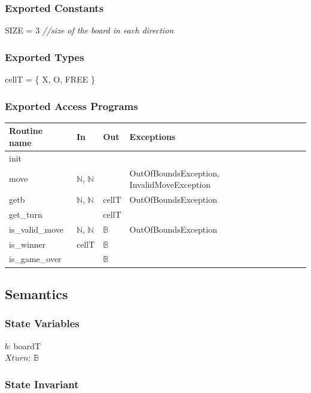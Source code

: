 \documentclass[12pt,fleqn]{examtst}
\begin{document}
\subsubsection* {Exported Constants}

SIZE = 3 {\it //size of the board in each direction}\\

\subsubsection* {Exported Types}

cellT = \{ X, O, FREE \} \\

\subsubsection* {Exported Access Programs}

\begin{tabular}{| l | l | l | p{7cm} |}
\hline
\textbf{Routine name} & \textbf{In} & \textbf{Out} & \textbf{Exceptions}\\
\hline
init & ~ & ~ & ~\\
\hline
move & $\mathbb{N}$, $\mathbb{N}$ & ~ & OutOfBoundsException, InvalidMoveException\\
\hline
getb & $\mathbb{N}$, $\mathbb{N}$ & cellT & OutOfBoundsException\\
\hline
get\_turn & ~ & cellT & ~\\
\hline
is\_valid\_move & $\mathbb{N}$, $\mathbb{N}$ & $\mathbb{B}$ & OutOfBoundsException\\
\hline
is\_winner & cellT & $\mathbb{B}$ & ~\\
\hline
is\_game\_over & ~ & $\mathbb{B}$ & ~\\
\hline

\end{tabular}

\subsection* {Semantics}

\subsubsection* {State Variables}

$b$: boardT\\
$\mathit{Xturn}$: $\mathbb{B}$

\subsubsection* {State Invariant}
\end{document}
